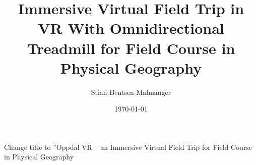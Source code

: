 \documentclass[british,titlepage]{ntnuthesis}
\title{Immersive Virtual Field Trip in VR With Omnidirectional Treadmill for Field Course in Physical Geography}
\author{Stian Bentsen Malmanger}
\date{\today}
\newcommand{\todo}[1]{{\color{green}#1}} %
\begin{document}
\todo{Change title to ''Oppdal VR -- an Immersive Virtual Field Trip for Field Course in Physical Geography}





\tableofcontents
\listoffigures
\listoftables
\lstlistoflistings









\printbibliography

%

\appendix
%
\end{document}

